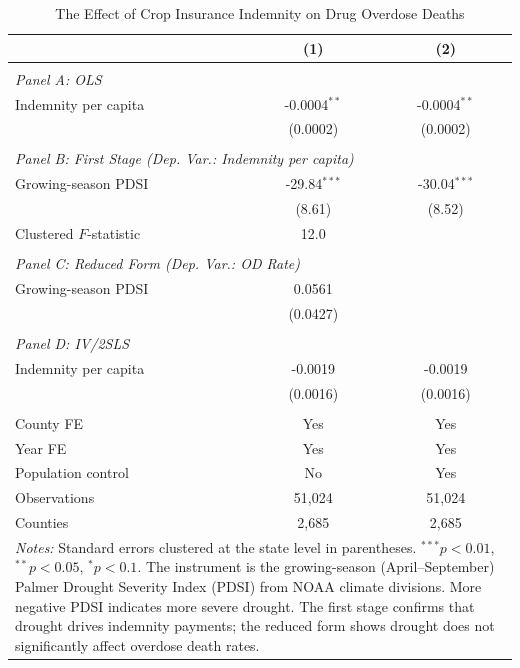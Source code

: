 \begin{table}[t]
\centering
\caption{The Effect of Crop Insurance Indemnity on Drug Overdose Deaths}
\label{tab:main}
\begin{tabular}{lcc}
\hline\hline
 & (1) & (2) \\
\hline
\\[-1.8ex]
\multicolumn{3}{l}{\textit{Panel A: OLS}} \\[0.3ex]
Indemnity per capita & -0.0004$^{**}$ & -0.0004$^{**}$ \\
 & (0.0002) & (0.0002) \\
\\[-1.8ex]
\multicolumn{3}{l}{\textit{Panel B: First Stage (Dep. Var.: Indemnity per capita)}} \\[0.3ex]
Growing-season PDSI & -29.84$^{***}$ & -30.04$^{***}$ \\
 & (8.61) & (8.52) \\
Clustered $F$-statistic & 12.0 & \\
\\[-1.8ex]
\multicolumn{3}{l}{\textit{Panel C: Reduced Form (Dep. Var.: OD Rate)}} \\[0.3ex]
Growing-season PDSI & 0.0561 & \\
 & (0.0427) & \\
\\[-1.8ex]
\multicolumn{3}{l}{\textit{Panel D: IV/2SLS}} \\[0.3ex]
Indemnity per capita & -0.0019 & -0.0019 \\
 & (0.0016) & (0.0016) \\
\\[-1.8ex]
\hline
County FE & Yes & Yes \\
Year FE & Yes & Yes \\
Population control & No & Yes \\
Observations & 51,024 & 51,024 \\
Counties & 2,685 & 2,685 \\
\hline\hline
\multicolumn{3}{p{0.85\textwidth}}{\footnotesize \textit{Notes:}
Standard errors clustered at the state level in parentheses.
$^{***}p<0.01$, $^{**}p<0.05$, $^{*}p<0.1$.
The instrument is the growing-season (April--September) Palmer Drought Severity
Index (PDSI) from NOAA climate divisions. More negative PDSI indicates more
severe drought. The first stage confirms that drought drives indemnity payments;
the reduced form shows drought does not significantly affect overdose death rates.}
\end{tabular}
\end{table}
